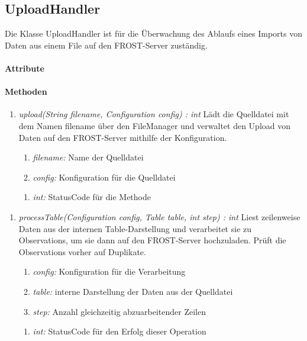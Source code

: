 \subsection{UploadHandler}
Die Klasse UploadHandler ist für die Überwachung des Ablaufs eines Imports von Daten aus einem File auf den FROST-Server zuständig.

\paragraph{Attribute}
\paragraph{Methoden}
\begin{enumerate}[+]
\item \textit{upload(String filename, Configuration config) : int}
Lädt die Quelldatei mit dem Namen filename über den FileManager und verwaltet den Upload von Daten auf den FROST-Server mithilfe der Konfiguration.
\begin{enumerate}[$\bullet$]
\item \textit{filename:} Name der Quelldatei
\item \textit{config:} Konfiguration für die Quelldatei 
\end{enumerate}
\vspace{-0.2cm}
\begin{enumerate}[$\circ$]
\item \textit{int:} StatusCode für die Methode
\end{enumerate}
\end{enumerate}

\begin{enumerate}[$-$]
\item \textit{processTable(Configuration config, Table table, int step) : int} Liest zeilenweise Daten aus der internen Table-Darstellung und verarbeitet sie zu Observations, um sie dann auf den FROST-Server hochzuladen. Prüft die Observations vorher auf Duplikate.
\begin{enumerate}[$\bullet$]
\item \textit{config:} Konfiguration für die Verarbeitung
\item \textit{table:} interne Darstellung der Daten aus der Quelldatei
\item \textit{step:} Anzahl gleichzeitig abzuarbeitender Zeilen
\end{enumerate}
\vspace{-0.2cm}
\begin{enumerate}[$\circ$]
\item \textit{int:} StatusCode für den Erfolg dieser Operation
\end{enumerate}
\end{enumerate}
